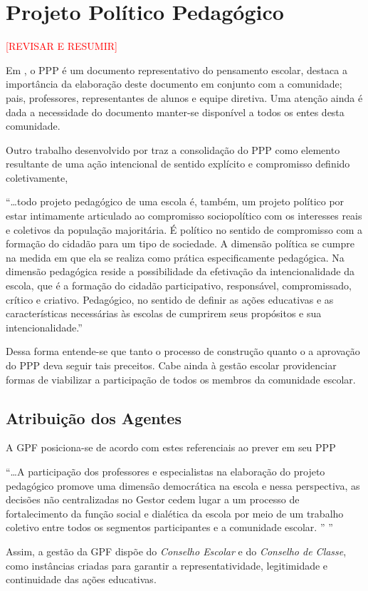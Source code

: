 \section{Projeto Político Pedagógico} %
\label{sec:Projeto Político Pedagógico}
\textcolor{red}{[REVISAR E RESUMIR]}

Em \cite{CARVALHO:2012a}, o \ac{PPP} é um documento representativo do pensamento escolar, destaca a importância da elaboração deste documento em conjunto com a comunidade; pais, professores, representantes de alunos e equipe diretiva. Uma atenção ainda é dada a necessidade do documento manter-se disponível a todos os entes desta comunidade. 

Outro trabalho desenvolvido por \cite{VEIGA:1995} traz a consolidação do PPP como elemento resultante de uma ação intencional de sentido explícito e compromisso definido coletivamente,

\begin{citacao}
    ``\ldots todo projeto pedagógico de uma escola é, também, um projeto político por estar intimamente articulado ao compromisso sociopolítico com os interesses reais e coletivos da população majoritária. É político no sentido de compromisso com a formação do cidadão para um tipo de sociedade. A dimensão política se cumpre na medida em que ela se realiza como prática especificamente pedagógica. Na dimensão pedagógica reside a possibilidade da efetivação da intencionalidade da escola, que é a formação do cidadão participativo, responsável, compromissado, crítico e criativo. Pedagógico, no sentido de definir as ações educativas e as características necessárias às escolas de cumprirem seus propósitos e sua intencionalidade.'' 
\end{citacao}
Dessa forma entende-se que tanto o processo de construção quanto o a aprovação do \ac{PPP} deva seguir tais preceitos. Cabe ainda à gestão escolar providenciar formas de viabilizar a participação de todos os membros da comunidade escolar. 

\subsection{Atribuição dos Agentes}
A \ac{GPF} posiciona-se de acordo com estes referenciais ao prever em seu \ac{PPP}

\begin{citacao}
    ``\ldots A participação dos professores e especialistas na elaboração do projeto pedagógico promove uma dimensão democrática na escola e nessa perspectiva, as decisões não centralizadas no Gestor cedem lugar a um processo de fortalecimento da função social e dialética da escola por meio de um trabalho coletivo entre todos os segmentos participantes e a comunidade escolar. '' \cite[p. ~5]{GPFPPP:2021}''
\end{citacao}
Assim, a gestão da \ac{GPF} dispõe do \emph{Conselho Escolar} e do \emph{Conselho de Classe}, como instâncias criadas para garantir a representatividade, legitimidade e continuidade das ações educativas.


